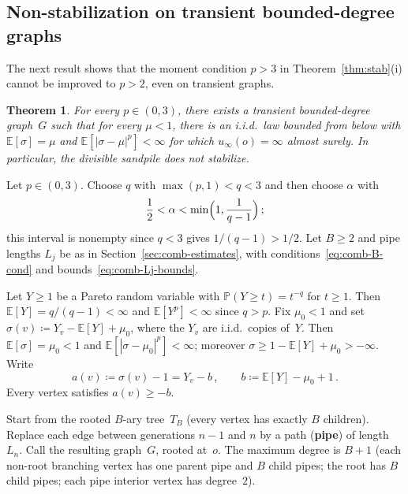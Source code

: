 \documentclass[11pt]{amsart}
\theoremstyle{plain}
\newtheorem{theorem}{Theorem}[section]
\theoremstyle{definition}
\newcommand{\E}{\mathbb{E}}
\renewcommand{\P}{\mathbb{P}}
\begin{document}
	\subsection{Non-stabilization on transient bounded-degree graphs}\label{sec:transient-nonstab}
	
	The next result shows that the moment condition $p > 3$ in Theorem~\ref{thm:stab}(i) cannot be improved to $p > 2$, even on transient graphs.
	
	\begin{theorem}\label{thm:transient-nonstab}
		For every $p\in(0,3)$, there exists a transient bounded-degree graph~$G$ such that for every $\mu<1$, there is an i.i.d.\ law bounded from below with $\E[\sigma]=\mu$ and $\E[|\sigma-\mu|^p]<\infty$ for which $u_\infty(o)=\infty$ almost surely. In particular, the divisible sandpile does not stabilize.
	\end{theorem}
	
	Let $p\in(0,3)$. Choose $q$ with $\max(p,1)<q<3$ and then choose $\alpha$ with
	\begin{equation}
		\frac{1}{2}<\alpha<\min\Bigl(1,\frac{1}{q-1}\Bigr)\,;
	\end{equation}
	this interval is nonempty since $q<3$ gives $1/(q-1)>1/2$. Let $B\geq 2$ and pipe lengths $L_j$ be as in Section~\ref{sec:comb-estimates}, with conditions~\eqref{eq:comb-B-cond} and bounds~\eqref{eq:comb-Lj-bounds}.
	
	Let $Y\geq 1$ be a Pareto random variable with $\P(Y\geq t)=t^{-q}$ for $t\geq 1$. Then $\E[Y]=q/(q{-}1)<\infty$ and $\E[Y^p]<\infty$ since $q>p$. Fix $\mu_0 < 1$ and set $\sigma(v)\coloneqq Y_v-\E[Y]+\mu_0$, where the $Y_v$ are i.i.d.\ copies of~$Y$. Then $\E[\sigma]=\mu_0<1$ and $\E[|\sigma-\mu_0|^p]<\infty$; moreover $\sigma\geq 1-\E[Y]+\mu_0>-\infty$. Write
	\begin{equation}\label{eq:tr-ab}
		a(v)\coloneqq\sigma(v)-1=Y_v-b\,,
		\qquad
		b\coloneqq\E[Y]-\mu_0+1\,.
	\end{equation}
	Every vertex satisfies $a(v)\geq -b$.
	
	Start from the rooted $B$-ary tree~$T_B$ (every vertex has exactly $B$ children). Replace each edge between generations $n{-}1$ and $n$ by a path (\textbf{pipe}) of length~$L_n$. Call the resulting graph~$G$, rooted at~$o$. The maximum degree is $B{+}1$ (each non-root branching vertex has one parent pipe and $B$ child pipes; the root has $B$ child pipes; each pipe interior vertex has degree~$2$).
	
\end{document}
